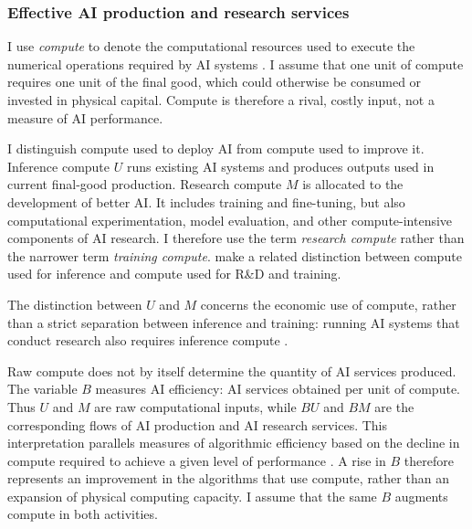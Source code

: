 \subsubsection{Effective AI production and research services}
\label{subsubsec:rewrite-ai-services}

I use \emph{compute} to denote the computational resources used to execute the numerical operations required by AI systems \citep{sastryetal2024}. %
I assume that one unit of compute requires one unit of the final good, which could otherwise be consumed or invested in physical capital. Compute is therefore a rival, costly input, not a measure of AI performance.

I distinguish compute used to deploy AI from compute used to improve it. Inference compute $U$ runs existing AI systems and produces outputs used in current final-good production. Research compute $M$ is allocated to the development of better AI. It includes training and fine-tuning, but also computational experimentation, model evaluation, and other compute-intensive components of AI research. I therefore use the term \emph{research compute} rather than the narrower term \emph{training compute}. \citet{korinekmckelvey2026} make a related distinction between compute used for inference and compute used for R\&D and training.

The distinction between $U$ and $M$ concerns the economic use of compute,
rather than a strict separation between inference and training: running AI
systems that conduct research also requires inference compute
\citep{davidsonetal2026}.


Raw compute does not by itself determine the quantity of AI services produced. The variable $B$ measures AI efficiency: AI services obtained per unit of compute. Thus $U$ and $M$ are raw computational inputs, while $BU$ and $BM$ are the corresponding flows of AI production and AI research services. This interpretation parallels measures of algorithmic efficiency based on the decline in compute required to achieve a given level of performance \citep{hernandezbrown2020,erdilbesiroglu2022}. A rise in $B$ therefore represents an improvement in the algorithms that use compute, rather than an expansion of physical computing capacity. I assume that the same $B$ augments compute in both activities.

